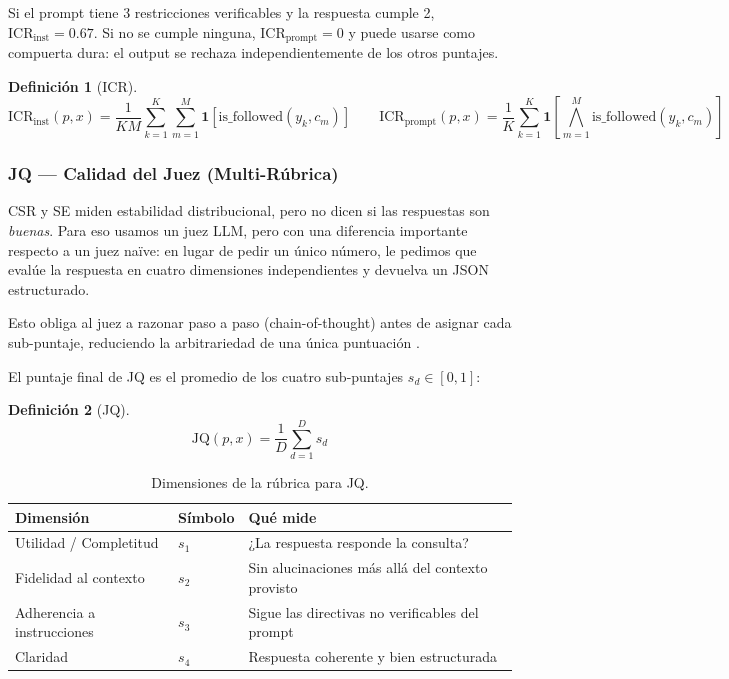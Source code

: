 \documentclass[11pt,a4paper]{article}
\newtheorem{definition}{Definición}
\begin{document}
Si el prompt tiene 3 restricciones verificables y la respuesta cumple 2, $\mathrm{ICR}_\mathrm{inst} = 0.67$. Si no se cumple ninguna, $\mathrm{ICR}_\mathrm{prompt} = 0$ y puede usarse como compuerta dura: el output se rechaza independientemente de los otros puntajes.

\begin{definition}[ICR]
\[
\mathrm{ICR}_\mathrm{inst}(p, x) = \frac{1}{KM} \sum_{k=1}^{K} \sum_{m=1}^{M} \mathbf{1}\left[\mathrm{is\_followed}(y_k, c_m)\right]
\qquad
\mathrm{ICR}_\mathrm{prompt}(p, x) = \frac{1}{K} \sum_{k=1}^{K} \mathbf{1}\left[\bigwedge_{m=1}^{M} \mathrm{is\_followed}(y_k, c_m)\right]
\]
\end{definition}

\subsubsection{JQ --- Calidad del Juez (Multi-Rúbrica)}

CSR y SE miden estabilidad distribucional, pero no dicen si las respuestas son \textit{buenas}. Para eso usamos un juez LLM, pero con una diferencia importante respecto a un juez naïve: en lugar de pedir un único número, le pedimos que evalúe la respuesta en cuatro dimensiones independientes y devuelva un JSON estructurado.

Esto obliga al juez a razonar paso a paso (chain-of-thought) antes de asignar cada sub-puntaje, reduciendo la arbitrariedad de una única puntuación \citep{geval2023, unieval2022}.

El puntaje final de JQ es el promedio de los cuatro sub-puntajes $s_d \in [0,1]$:

\begin{definition}[JQ]
\[
\mathrm{JQ}(p, x) = \frac{1}{D} \sum_{d=1}^{D} s_d
\]
\end{definition}

\begin{table}[h]
\centering
\caption{Dimensiones de la rúbrica para JQ.}
\begin{tabular}{lll}
\toprule
Dimensión & Símbolo & Qué mide \\
\midrule
Utilidad / Completitud & $s_1$ & ¿La respuesta responde la consulta? \\
Fidelidad al contexto & $s_2$ & Sin alucinaciones más allá del contexto provisto \\
Adherencia a instrucciones & $s_3$ & Sigue las directivas no verificables del prompt \\
Claridad & $s_4$ & Respuesta coherente y bien estructurada \\
\bottomrule
\end{tabular}
\end{table}
\end{document}
